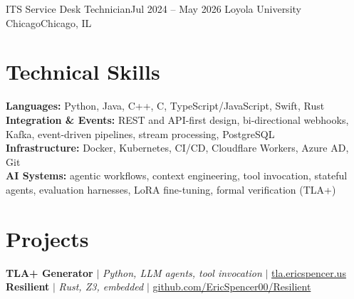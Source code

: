 \documentclass[letterpaper,10pt]{article}
\begin{document}
  \resumeSubheading
    {ITS Service Desk Technician}{Jul 2024 -- May 2026}
    {Loyola University Chicago}{Chicago, IL}
    \resumeItemListStart
    \resumeItemListEnd

\resumeSubHeadingListEnd

\section*{Technical Skills}
\begin{itemize}[leftmargin=0.15in, label={}]
  \small{
    \item{
      \textbf{Languages:} Python, Java, C++, C, TypeScript/JavaScript, Swift, Rust \\
      \textbf{Integration \& Events:} REST and API-first design, bi-directional webhooks, Kafka, event-driven pipelines, stream processing, PostgreSQL \\
      \textbf{Infrastructure:} Docker, Kubernetes, CI/CD, Cloudflare Workers, Azure AD, Git \\
      \textbf{AI Systems:} agentic workflows, context engineering, tool invocation, stateful agents, evaluation harnesses, LoRA fine-tuning, formal verification (TLA+)
    }
  }
\end{itemize}

\section*{Projects}
\resumeSubHeadingListStart
\resumeProjectHeading
  {\textbf{TLA+ Generator} $|$ \emph{Python, LLM agents, tool invocation} $|$ \underline{tla.ericspencer.us}}{}
  \resumeItemListStart
  \resumeItemListEnd
\resumeProjectHeading
  {\textbf{Resilient} $|$ \emph{Rust, Z3, embedded} $|$ \underline{github.com/EricSpencer00/Resilient}}{}
  \resumeItemListStart
  \resumeItemListEnd
\resumeSubHeadingListEnd
\end{document}
